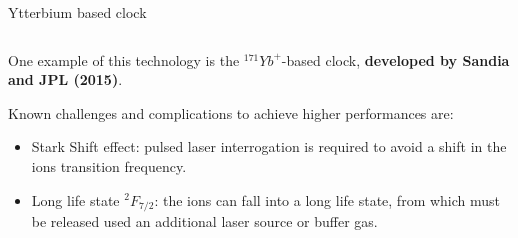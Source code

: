 \begin{frame}{Ytterbium based clock}
\begin{columns}[c, onlytextwidth]
\begin{column}{0.65\textwidth}
            One example of this technology is the $^{171}Yb^+$-based clock, \textbf{developed by Sandia and JPL (2015)}.

            \vspace{10pt}

            Known challenges and complications to achieve higher performances are:

            \begin{itemize}
                \item Stark Shift effect: pulsed laser interrogation is required to avoid a shift in the ions transition frequency.
                \item Long life state $^2F_{7/2}$: the ions can fall into a long life state, from which must be released used an additional laser source or buffer gas.
            \end{itemize}

        \end{column}

    \end{columns}

\end{frame}



